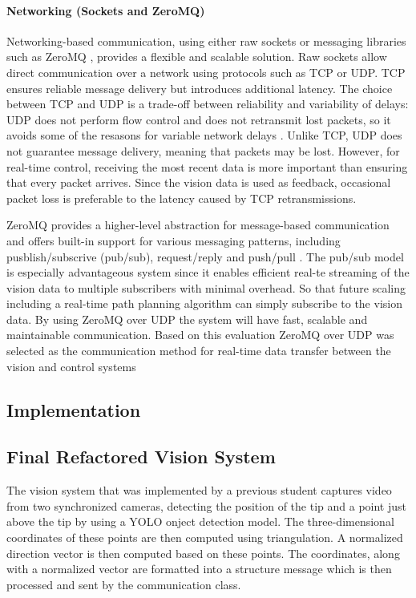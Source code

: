 \paragraph*{Networking (Sockets and ZeroMQ)}
Networking-based communication, using either raw sockets or messaging libraries such as ZeroMQ , provides a flexible and scalable solution. Raw sockets allow direct communication over a network using protocols such as TCP or UDP. TCP ensures reliable message delivery but introduces additional latency. The choice between TCP and UDP is a trade-off between reliability and variability of delays: UDP does not perform flow control and does not retransmit lost packets, so it avoids some of the resasons for variable network delays \cite{kleppmann_designing_2017}. Unlike TCP, UDP does not guarantee message delivery, meaning that packets may be lost.  However, for real-time control, receiving the most recent data is more important than ensuring that every packet arrives. Since the vision data is used as feedback, occasional packet loss is preferable to the latency caused by TCP retransmissions. 

ZeroMQ provides a higher-level abstraction for message-based communication and offers built-in support for various messaging patterns, including pusblish/subscrive (pub/sub), request/reply and push/pull . The pub/sub model is especially advantageous system since it enables efficient real-te streaming of the vision data to multiple subscribers with minimal overhead. So that future scaling including a real-time path planning algorithm can simply subscribe to the vision data. By using ZeroMQ over UDP the system will have fast, scalable and maintainable communication. Based on this evaluation ZeroMQ over UDP was selected as the communication method for real-time data transfer between the vision and control systems

\subsection{Implementation}

\subsection{Final Refactored Vision System}

The vision system that was implemented by a previous student  captures video from two synchronized cameras, detecting the position of the tip and a point just above   the tip by using a YOLO onject detection model. The three-dimensional coordinates of these points are then computed using triangulation. A normalized direction vector is then computed based on these points. The coordinates, along with a normalized vector are formatted into a structure message which is then processed and sent by the communication class. 

